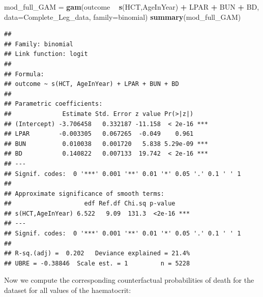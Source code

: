 \documentclass[]{article}
\newenvironment{Shaded}{\begin{snugshade}}{\end{snugshade}}
\newcommand{\KeywordTok}[1]{\textcolor[rgb]{0.13,0.29,0.53}{\textbf{#1}}}
\newcommand{\DataTypeTok}[1]{\textcolor[rgb]{0.13,0.29,0.53}{#1}}
\newcommand{\StringTok}[1]{\textcolor[rgb]{0.31,0.60,0.02}{#1}}
\newcommand{\OperatorTok}[1]{\textcolor[rgb]{0.81,0.36,0.00}{\textbf{#1}}}
\newcommand{\NormalTok}[1]{#1}
\begin{document}
\begin{Shaded}
\begin{Highlighting}[]
\NormalTok{mod_full_GAM =}\StringTok{ }\KeywordTok{gam}\NormalTok{(outcome }\OperatorTok{~}\StringTok{ }\KeywordTok{s}\NormalTok{(HCT,AgeInYear) }\OperatorTok{+}\StringTok{ }\NormalTok{LPAR }\OperatorTok{+}\StringTok{ }\NormalTok{BUN }\OperatorTok{+}\StringTok{ }\NormalTok{BD,}
               \DataTypeTok{data=}\NormalTok{Complete_Leg_data, }\DataTypeTok{family=}\NormalTok{binomial)}
\KeywordTok{summary}\NormalTok{(mod_full_GAM)}
\end{Highlighting}
\end{Shaded}

\begin{verbatim}
## 
## Family: binomial 
## Link function: logit 
## 
## Formula:
## outcome ~ s(HCT, AgeInYear) + LPAR + BUN + BD
## 
## Parametric coefficients:
##              Estimate Std. Error z value Pr(>|z|)    
## (Intercept) -3.706458   0.332187 -11.158  < 2e-16 ***
## LPAR        -0.003305   0.067265  -0.049    0.961    
## BUN          0.010038   0.001720   5.838 5.29e-09 ***
## BD           0.140822   0.007133  19.742  < 2e-16 ***
## ---
## Signif. codes:  0 '***' 0.001 '**' 0.01 '*' 0.05 '.' 0.1 ' ' 1
## 
## Approximate significance of smooth terms:
##                    edf Ref.df Chi.sq p-value    
## s(HCT,AgeInYear) 6.522   9.09  131.3  <2e-16 ***
## ---
## Signif. codes:  0 '***' 0.001 '**' 0.01 '*' 0.05 '.' 0.1 ' ' 1
## 
## R-sq.(adj) =  0.202   Deviance explained = 21.4%
## UBRE = -0.38846  Scale est. = 1         n = 5228
\end{verbatim}

Now we compute the corresponding counterfactual probabilities of death
for the dataset for all values of the haematocrit:
\end{document}
